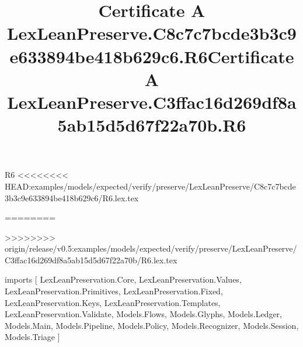 \begin{lexlean}{R6}
<<<<<<<< HEAD:examples/models/expected/verify/preserve/LexLeanPreserve/C8c7c7bcde3b3c9e633894be418b629c6/R6.lex.tex
\title{Certificate A LexLeanPreserve.C8c7c7bcde3b3c9e633894be418b629c6.R6}
========
\title{Certificate A LexLeanPreserve.C3ffac16d269df8a5ab15d5d67f22a70b.R6}
>>>>>>>> origin/release/v0.5:examples/models/expected/verify/preserve/LexLeanPreserve/C3ffac16d269df8a5ab15d5d67f22a70b/R6.lex.tex
\begin{coremodule}
imports [
  LexLeanPreservation.Core,
  LexLeanPreservation.Values,
  LexLeanPreservation.Primitives,
  LexLeanPreservation.Fixed,
  LexLeanPreservation.Keys,
  LexLeanPreservation.Templates,
  LexLeanPreservation.Validate,
  Models.Flows,
  Models.Glyphs,
  Models.Ledger,
  Models.Main,
  Models.Pipeline,
  Models.Policy,
  Models.Recognizer,
  Models.Session,
  Models.Triage
]


\end{coremodule}
\end{lexlean}
